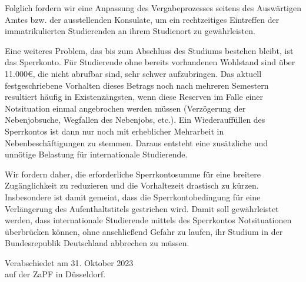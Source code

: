 \documentclass[DIV=calc]{scrartcl}
\begin{document}
Folglich fordern wir eine Anpassung des Vergabeprozesses seitens des Auswärtigen Amtes bzw. der ausstellenden Konsulate, um ein rechtzeitiges Eintreffen der immatrikulierten Studierenden an ihrem Studienort zu gewährleisten.

Eine weiteres Problem, das bis zum Abschluss des Studiums bestehen bleibt, ist das Sperrkonto. Für Studierende ohne bereits vorhandenen Wohlstand sind über 11.000€, die nicht abrufbar sind, sehr schwer aufzubringen. Das aktuell festgeschriebene Vorhalten dieses Betrags noch nach mehreren Semestern resultiert häufig in Existenzängsten, wenn diese Reserven im Falle einer Notsituation einmal angebrochen werden müssen (Verzögerung der Nebenjobsuche, Wegfallen des Nebenjobs, etc.). Ein Wiederauffüllen des Sperrkontos ist dann nur noch mit erheblicher Mehrarbeit in Nebenbeschäftigungen zu stemmen. Daraus entsteht eine zusätzliche und unnötige Belastung für internationale Studierende.\newpage

Wir fordern daher, die erforderliche Sperrkontosumme für eine breitere Zugänglichkeit zu reduzieren und die Vorhaltezeit drastisch zu kürzen. Insbesondere ist damit gemeint, dass die Sperrkontobedingung für eine Verlängerung des Aufenthaltstitels gestrichen wird. Damit soll gewährleistet werden, dass internationale Studierende mittels des Sperrkontos Notsituationen überbrücken können, ohne anschließend Gefahr zu laufen, ihr Studium in der Bundesrepublik Deutschland abbrechen zu müssen.


%
\vfill
\begin{flushright}
	Verabschiedet am 31. Oktober 2023 \\
	auf der ZaPF in Düsseldorf.
\end{flushright}
\end{document}
